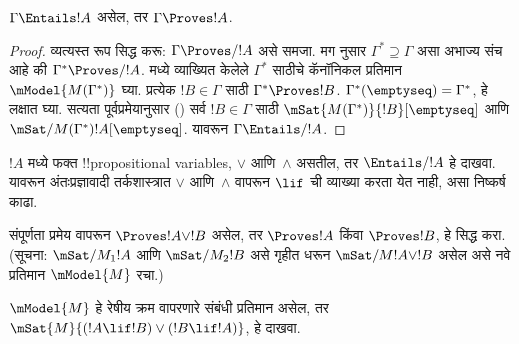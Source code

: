 \documentclass[../../../include/open-logic-section]{subfiles}
\begin{document}


\begin{thm}
  $\Gamma \Entails !A$ असेल, तर
  $\Gamma \Proves !A$.
\end{thm}

\begin{proof}
  व्यत्यस्त रूप सिद्ध करू:
  $\Gamma \Proves/ !A$ असे समजा.
  मग  नुसार
  $\Gamma^* \supseteq \Gamma$ असा
  अभाज्य संच आहे की
  $\Gamma^* \Proves/ !A$.
  मध्ये व्याख्यित केलेले $\Gamma^*$ साठीचे
  कॅनॉनिकल प्रतिमान~$\mModel{M(\Gamma^*)}$
  घ्या. प्रत्येक $!B \in \Gamma$
  साठी $\Gamma^* \Proves !B$.
  $\Gamma^*(\emptyseq) = \Gamma^*$,
  हे लक्षात घ्या. सत्यता पूर्वप्रमेयानुसार
  ()
  सर्व $!B \in \Gamma$ साठी
  $\mSat{M(\Gamma^*)}{!B}[\emptyseq]$
  आणि
  $\mSat/{M(\Gamma^*)}{!A}[\emptyseq]$.
  यावरून $\Gamma \Entails/ !A$.
\end{proof}

\begin{prob}
  $!A$ मध्ये फक्त !!{propositional variable}s,
  $\lor$ आणि~$\land$ असतील, तर
  $\Entails/ !A$ हे दाखवा.
  यावरून अंतःप्रज्ञावादी तर्कशास्त्रात
  $\lor$ आणि~$\land$ वापरून
  $\lif$ ची व्याख्या करता येत नाही,
  असा निष्कर्ष काढा.
\end{prob}

\begin{prob}
  संपूर्णता प्रमेय वापरून
  $\Proves !A \lor !B$ असेल,
  तर $\Proves !A$ किंवा
  $\Proves !B$, हे सिद्ध करा.
  (सूचना: $\mSat/{M_1}{!A}$
  आणि $\mSat/{M_2}{!B}$
  असे गृहीत धरून
  $\mSat/{M}{!A \lor !B}$
  असेल असे नवे प्रतिमान
  $\mModel{M}$ रचा.)
\end{prob}

\begin{prob}
  $\mModel{M}$ हे रेषीय क्रम
  वापरणारे संबंधी प्रतिमान असेल,
  तर $\mSat{M}{(!A \lif !B)\lor(!B \lif !A)}$,
  हे दाखवा.
\end{prob}
\end{document}

